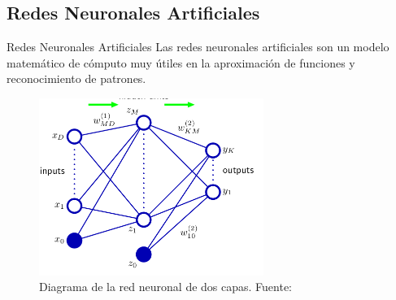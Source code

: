 \documentclass[10pt]{beamer}
\begin{document}

\subsection{Redes Neuronales Artificiales}
\begin{frame}{Redes Neuronales Artificiales}
    Las redes neuronales artificiales son un modelo matemático de cómputo muy útiles en la aproximación de funciones y reconocimiento de patrones.

    \begin{figure}[!h] 
        \centering
        \includegraphics[width=0.65\textwidth]{../img/reddoscapas}
        \caption[Diagrama de una red neuronal de dos capas]{Diagrama de la red neuronal de dos capas. Fuente: \cite{Bishop2006} }
        \label{fig:reddoscapas}
    \end{figure}

\end{frame}
\end{document}
